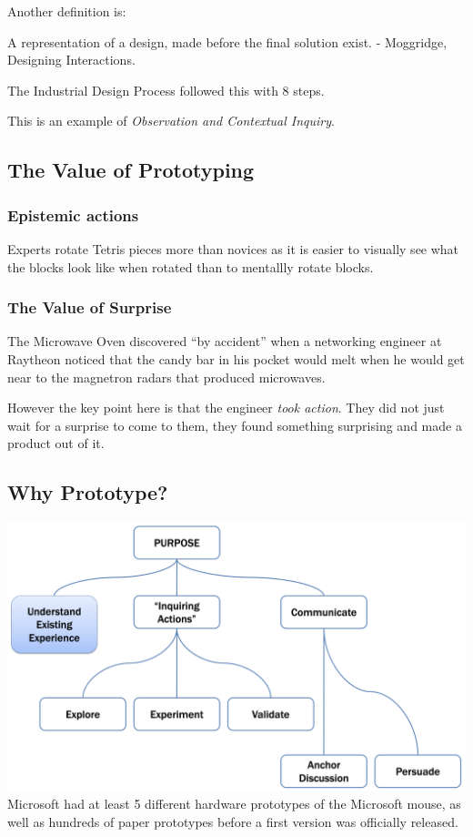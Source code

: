 Another definition is:
\begin{shaded}
A representation of a design, made before the final solution exist. - Moggridge, Designing Interactions.
\end{shaded}

The Industrial Design Process followed this with 8 steps.

This is an example of \textit{Observation and Contextual Inquiry}.

\subsection{The Value of Prototyping}
\subsubsection{Epistemic actions}
Experts rotate Tetris pieces more than novices as it is easier to visually see what the blocks look like when rotated than to mentallly rotate blocks.

\subsubsection{The Value of Surprise}
The Microwave Oven discovered ``by accident'' when a networking engineer at Raytheon noticed that the candy bar in his pocket would melt when he would get near to the magnetron radars that produced microwaves.

However the key point here is that the engineer \textit{took action}. They did not just wait for a surprise to come to them, they found something surprising and made a product out of it.

\subsection{Why Prototype?}
\includegraphics[scale=0.15]{lectures/wk5/img/why_prototype.png}\\
Microsoft had at least 5 different hardware prototypes of the Microsoft mouse, as well as hundreds of paper prototypes before a first version was officially released.

